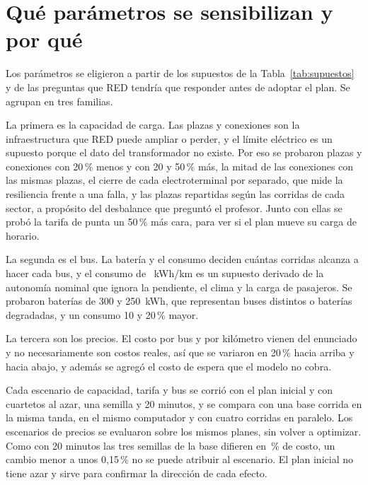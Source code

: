 
\section{Qué parámetros se sensibilizan y por qué}
\label{sec:justificacion-sens}

Los parámetros se eligieron a partir de los supuestos de la Tabla~\ref{tab:supuestos} y de las preguntas que RED tendría que responder antes de adoptar el plan. Se agrupan en tres familias.

La primera es la capacidad de carga. Las plazas y conexiones son la infraestructura que RED puede ampliar o perder, y el límite eléctrico es un supuesto porque el dato del transformador no existe. Por eso se probaron plazas y conexiones con 20\,\% menos y con 20 y 50\,\% más, la mitad de las conexiones con las mismas plazas, el cierre de cada electroterminal por separado, que mide la resiliencia frente a una falla, y las plazas repartidas según las corridas de cada sector, a propósito del desbalance que preguntó el profesor. Junto con ellas se probó la tarifa de punta un 50\,\% más cara, para ver si el plan mueve su carga de horario.

La segunda es el bus. La batería y el consumo deciden cuántas corridas alcanza a hacer cada bus, y el consumo de \Consumo~kWh/km es un supuesto derivado de la autonomía nominal que ignora la pendiente, el clima y la carga de pasajeros. Se probaron baterías de 300 y 250~kWh, que representan buses distintos o baterías degradadas, y un consumo 10 y 20\,\% mayor.

La tercera son los precios. El costo por bus y por kilómetro vienen del enunciado y no necesariamente son costos reales, así que se variaron en 20\,\% hacia arriba y hacia abajo, y además se agregó el costo de espera que el modelo no cobra.

Cada escenario de capacidad, tarifa y bus se corrió con el plan inicial y con cuartetos al azar, una semilla y 20 minutos, y se compara con una base corrida en la misma tanda, en el mismo computador y con cuatro corridas en paralelo. Los escenarios de precios se evaluaron sobre los mismos planes, sin volver a optimizar. Como con 20 minutos las tres semillas de la base difieren en \RuidoSemillas\,\% de costo, un cambio menor a unos 0,15\,\% no se puede atribuir al escenario. El plan inicial no tiene azar y sirve para confirmar la dirección de cada efecto. %

